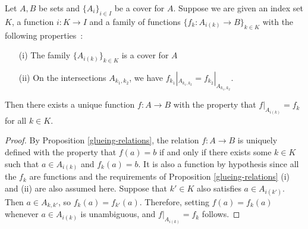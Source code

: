 \begin{corollary} \label{glueing-functions}
	Let $A,B$ be sets and $\{A_i\}_{i \in I}$ be a cover for $A$. Suppose we are given an index set $K$, a function $i : K \to I$ and a family of functions $\{f_k : A_{i(k)} \to B \}_{k \in K}$ with the following properties~:
	\\

	\begin{itemize}
		\item[(i)] The family $\{A_{i(k)}\}_{k \in K}$ is a cover for $A$ \\
		\item[(ii)] On the intersections $A_{k_1,k_2}$, we have $f_{k_1}|_{A_{k_1,k_2}} = f_{k_2}|_{A_{k_1,k_2}}$. \\
	\end{itemize}
	Then there exists a unique function $f : A \to B$ with the property that $f|_{A_{i(k)}} = f_k$ for all $k \in K$.
\end{corollary}

\begin{proof}
	By Proposition \autoref{glueing-relations}, the relation $f : A \to B$ is uniquely defined with the property that $f(a) = b$ if and only if there exists some $k \in K$ such that $a \in A_{i(k)}$ and $f_k(a) = b$. It is also a function by hypothesis since all the $f_k$ are functions and the requirements of Proposition \autoref{glueing-relations} (i) and (ii) are also assumed here. Suppose that $k' \in K$ also satisfies $a \in A_{i(k')}$. Then $a \in A_{k,k'}$, so $f_k(a) = f_{k'}(a)$. Therefore, setting $f(a) = f_k(a)$ whenever $a \in A_{i(k)}$ is unambiguous, and $f|_{A_{i(k)}} = f_k$ follows.
\end{proof}